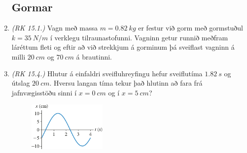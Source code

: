 \ifdefined \wholebook \else\documentclass[oneside]{book}\usepackage{EdlBook}\graphicspath{{figures/}}
\begin{document}
\begin{enumerate}[label = \textbf{Dæmi \thechapter.\arabic*.}]

\subsection*{Gormar}

\item \textit{(RK 15.1.)} Vagn með massa $m = \SI{0.82}{kg}$ er festur við gorm með gormstuðul $k = \SI{35}{N/m}$ í verklegu tilraunastofunni. Vagninn getur runnið meðfram láréttum fleti og eftir að við strekkjum á gorminum þá sveiflast vagninn á milli $\SI{20}{cm}$ og $\SI{70}{cm}$ á brautinni.

\item \textit{(RK 15.4.)} Hlutur á einfaldri sveifluhreyfingu hefur sveiflutíma $\SI{1.82}{s}$ og útslag $\SI{20}{cm}$. Hversu langan tíma tekur það hlutinn að fara frá jafnvægisstöðu sinni í $x = \SI{0}{cm}$ og í $x = \SI{5}{cm}$?

\vspace{0.1cm}

\begin{minipage}{\linewidth}

\begin{figure}
\vspace{-0.75cm}
\includegraphics[width = 1.5in]{figures/stada-timi-graf3.pdf}
\end{figure}


\end{minipage}
\end{enumerate}
\end{document}
